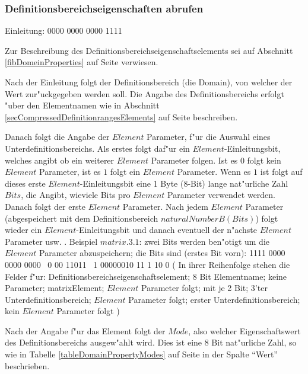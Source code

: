 

\subsubsection{Definitionsbereichseigenschaften abrufen}

Einleitung: 0000 0000 0000 1111

\bigskip\noindent
Zur Beschreibung des Definitionsbereichseigenschaftselements sei auf Abschnitt \ref{fibDomeinProperties} auf Seite \pageref{fibDomeinProperties} verwiesen.

Nach der Einleitung folgt der Definitionsbereich (die Domain), von welcher der Wert zur"uckgegeben werden soll. Die Angabe des Definitionsbereichs erfolgt "uber den Elementnamen wie in Abschnitt \ref{secCompressedDefinitionrangesElements} auf Seite \pageref{secCompressedDefinitionrangesElements} beschreiben.

Danach folgt die Angabe der $Element$ Parameter, f"ur die Auswahl eines Unterdefinitionsbereichs. Als erstes folgt daf"ur ein $Element$-Einleitungsbit, welches angibt ob ein weiterer $Element$ Parameter folgen. Ist es $0$ folgt kein $Element$ Parameter, ist es $1$ folgt ein $Element$ Parameter. Wenn es $1$  ist folgt auf dieses erste $Element$-Einleitungsbit eine 1 Byte (8-Bit) lange nat"urliche Zahl $Bits$, die Angibt, wieviele Bits pro $Element$ Parameter verwendet werden. Danach folgt der erste $Element$ Parameter. Nach jedem $Element$ Parameter (abgespeichert mit dem Definitionsbereich $naturalNumberB( Bits )$) folgt wieder ein $Element$-Einleitungsbit und danach eventuell der n"achste $Element$ Parameter usw. .  Beispiel $matrix.3.1$: zwei Bits werden ben"otigt um die $Element$ Parameter abzuspeichern; die Bits sind (erstes Bit vorn): 1111 0000 0000 0000 \  0 00 11011 \ 1 00000010 11  1 10  0 ( In ihrer Reihenfolge stehen die Felder f"ur: Definitionsbereichseigenschaftselement; 8 Bit Elementname; keine Parameter; matrixElement; $Element$ Parameter folgt; mit je 2 Bit; 3'ter Unterdefinitionsbereich; $Element$ Parameter folgt; erster Unterdefinitionsbereich; kein $Element$ Parameter folgt )

Nach der Angabe f"ur das Element folgt der $Mode$, also welcher Eigenschaftswert des Definitionsbereichs ausgew"ahlt wird. Dies ist eine 8 Bit nat"urliche Zahl, so wie in Tabelle \ref{tableDomainPropertyModes} auf Seite \pageref{tableDomainPropertyModes} in der Spalte ``Wert'' beschrieben.

